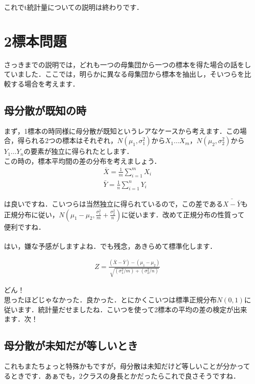\documentclass[11pt,a4paper]{ujreport} 	%
\begin{document}
これでt統計量についての説明は終わりです．


\section{2標本問題}
さっきまでの説明では，どれも一つの母集団から一つの標本を得た場合の話をしていました．ここでは，明らかに異なる母集団から標本を抽出し，そいつらを比較する場合を考えます．

\subsection{母分散が既知の時}
まず，1標本の時同様に母分散が既知というレアなケースから考えます．この場合，得られる2つの標本はそれぞれ，$N(\mu_1, \sigma_1^2)$から$X_1...X_m$，$N(\mu_2, \sigma_2^2)$から$Y_1...Y_n$の要素が独立に得られたとします．\\

この時の，標本平均間の差の分布を考えましょう．\\

\begin{align}
  \bar{X} = \frac{1}{m}\sum_{i=1}^m X_i\\
  \bar{Y} = \frac{1}{n}\sum_{i=1}^n Y_i
\end{align}

は良いですね．こいつらは当然独立に得られているので，この差である$\bar{X-\bar{Y}}$も正規分布に従い，$N(\mu_1 - \mu_2, \frac{\sigma_1^2}{m} + \frac{\sigma_2^2}{n})$に従います．改めて正規分布の性質って便利ですね．\\
\\

はい，嫌な予感がしますよね．でも残念，あきらめて標準化します．

\begin{align}
  Z = \frac{(\bar{X} - \bar{Y})-(\mu_1-\mu_2)}{\sqrt{(\sigma_1^2/m)+(\sigma_2^2/n)}}
  \label{eq:z2}
\end{align}

どん！\\

思ったほどじゃなかった．良かった．とにかくこいつは標準正規分布$N(0,1)$に従います．統計量だせましたね．こいつを使って2標本の平均の差の検定が出来ます．次！



\subsection{母分散が未知だが等しいとき}
これもまたちょっと特殊かもですが，母分散は未知だけど等しいことが分かってるときです．あぁでも，2クラスの身長とかだったらこれで良さそうですね．\\
\end{document}
